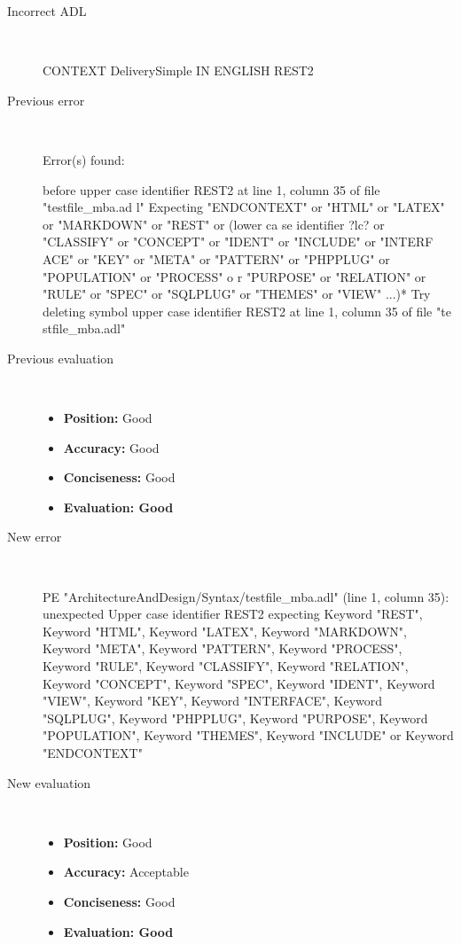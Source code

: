 \begin{description}
  \item[Incorrect ADL]~\\
\begin{adl}
CONTEXT DeliverySimple IN ENGLISH REST2\end{adl}
  \item[Previous error]~\\
\begin{haskell}
Error(s) found:

before upper case identifier REST2 at line 1, column 35 of file "testfile_mba.ad
l"
Expecting "ENDCONTEXT" or "HTML" or "LATEX" or "MARKDOWN" or "REST" or (lower ca
se identifier ?lc? or "CLASSIFY" or "CONCEPT" or "IDENT" or "INCLUDE" or "INTERF
ACE" or "KEY" or "META" or "PATTERN" or "PHPPLUG" or "POPULATION" or "PROCESS" o
r "PURPOSE" or "RELATION" or "RULE" or "SPEC" or "SQLPLUG" or "THEMES" or "VIEW"
 ...)*
Try deleting symbol upper case identifier REST2 at line 1, column 35 of file "te
stfile_mba.adl"\end{haskell}
  \item[Previous evaluation]~\\
    \begin{itemize}
    \item \textbf{Position:} Good
    \item \textbf{Accuracy:} Good
    \item \textbf{Conciseness:} Good
    \item \textbf{Evaluation: Good}
    \end{itemize}
  \item[New error]~\\
\begin{haskell}
PE "ArchitectureAndDesign/Syntax/testfile_mba.adl" (line 1, column 35):
unexpected Upper case identifier REST2
expecting Keyword "REST", Keyword "HTML", Keyword "LATEX", Keyword "MARKDOWN", Keyword "META", Keyword "PATTERN", Keyword "PROCESS", Keyword "RULE", Keyword "CLASSIFY", Keyword "RELATION", Keyword "CONCEPT", Keyword "SPEC", Keyword "IDENT", Keyword "VIEW", Keyword "KEY", Keyword "INTERFACE", Keyword "SQLPLUG", Keyword "PHPPLUG", Keyword "PURPOSE", Keyword "POPULATION", Keyword "THEMES", Keyword "INCLUDE" or Keyword "ENDCONTEXT"
\end{haskell}
  \item[New evaluation]~\\
    \begin{itemize}
    \item \textbf{Position:} Good
    \item \textbf{Accuracy:} Acceptable
    \item \textbf{Conciseness:} Good
    \item \textbf{Evaluation: Good}
    \end{itemize}
  \end{description}

